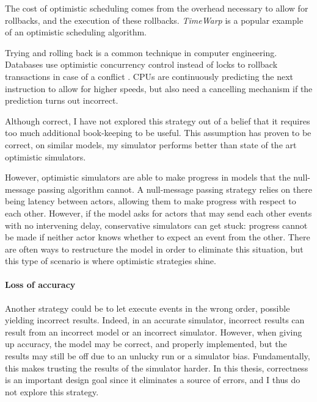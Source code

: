 The cost of optimistic scheduling comes from the overhead necessary to allow for rollbacks, and the execution of these rollbacks.
\emph{TimeWarp} \cite{} is a popular example of an optimistic scheduling algorithm.

Trying and rolling back is a common technique in computer engineering.
Databases use optimistic concurrency control instead of locks to rollback transactions in case of a conflict \cite{dragojevic_no_2015}.
CPUs are continuously predicting the next instruction to allow for higher speeds, but also need a cancelling mechanism if the prediction turns out incorrect.

Although correct, I have not explored this strategy out of a belief that it requires too much additional book-keeping to be useful.
This assumption has proven to be correct, on similar models, my simulator performs better than state of the art optimistic simulators.

However, optimistic simulators are able to make progress in models that the null-message passing algorithm cannot.
A null-message passing strategy relies on there being latency between actors, allowing them to make progress with respect to each other.
However, if the model asks for actors that may send each other events with no intervening delay, conservative simulators can get stuck: progress cannot be made if neither actor knows whether to expect an event from the other.
There are often ways to restructure the model in order to eliminate this situation, but this type of scenario is where optimistic strategies shine.

\paragraph{Loss of accuracy}
Another strategy could be to let execute events in the wrong order, possible yielding incorrect results.
Indeed, in an accurate simulator, incorrect results can result from an incorrect model or an incorrect simulator.
However, when giving up accuracy, the model may be correct, and properly implemented, but the results may still be off due to an unlucky run or a simulator bias.
Fundamentally, this makes trusting the results of the simulator harder.
In this thesis, correctness is an important design goal since it eliminates a source of errors, and I thus do not explore this strategy.
